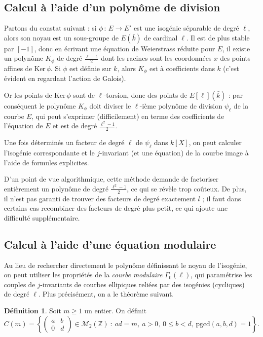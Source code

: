 \documentclass[11pt,a4paper]{article}
\newcommand{\Z}{\mathbb{Z}}
\newcommand{\M}{\mathcal{M}}
\newcommand{\vers}{\rightarrow}
\newcommand{\de}{\,:\,}
\theoremstyle{definition}
\newtheorem{defi}[thm]{Définition}
\begin{document}
\subsection{Calcul à l'aide d'un polynôme de division}

Partons du constat suivant : si $\phi\de E\vers E'$ est une isogénie séparable de degré $\ell$, alors son noyau est un sous-groupe de $E(\bar{k})$ de cardinal $\ell$. Il est de plus stable par $[-1]$, donc en écrivant une équation de Weierstrass réduite pour $E$, il existe un polynôme $K_\phi$ de degré $\frac{\ell-1}{2}$ dont les racines sont les coordonnées $x$ des points affines de Ker\,$\phi$. Si $\phi$ est définie sur $k$, alors $K_\phi$ est à coefficients dans $k$ (c'est évident en regardant l'action de Galois).

Or les points de Ker\,$\phi$ sont de $\ell$-torsion, donc des points de $E[\ell](\bar{k})$ : par conséquent le polynôme $K_\phi$ doit diviser le $\ell$-ième polynôme de division $\psi_\ell$ de la courbe $E$, qui peut s'exprimer (difficilement) en terme des coefficients de l'équation de $E$ et est de degré $\frac{\ell^2-1}{2}$.

Une fois déterminés un facteur de degré $\ell$ de $\psi_\ell$ dans $k[X]$, on peut calculer l'isogénie correspondante et le $j$-invariant (et une équation) de la courbe image à l'aide de formules explicites.

D'un point de vue algorithmique, cette méthode demande de factoriser entièrement un polynôme de degré $\frac{\ell^2-1}{2}$, ce qui se révèle trop coûteux. De plus, il n'est pas garanti de trouver des facteurs de degré exactement $l$ ; il faut dans certains cas recombiner des facteurs de degré plus petit, ce qui ajoute une difficulté supplémentaire.

\subsection{Calcul à l'aide d'une équation modulaire}

Au lieu de rechercher directement le polynôme définissant le noyau de l'isogénie, on peut utiliser les propriétés de la \emph{courbe modulaire} $\Gamma_0(\ell)$, qui paramétrise les couples de $j$-invariants de courbes ellipiques reliées par des isogénies (cycliques) de degré $\ell$. Plus précisément, on a le théorème suivant.

\begin{defi}
Soit $m\geq 1$ un entier. On définit
$$C(m)=\left\{ 
\left(
\begin{matrix}
a & b \\
0 & d 
\end{matrix}
\right)
\in \M_2(\Z)\ :\ ad=m,\ a>0,\ 0\leq b<d,\ \mathrm{pgcd}(a,b,d)=1\right\}.$$
\end{defi}
\end{document}
